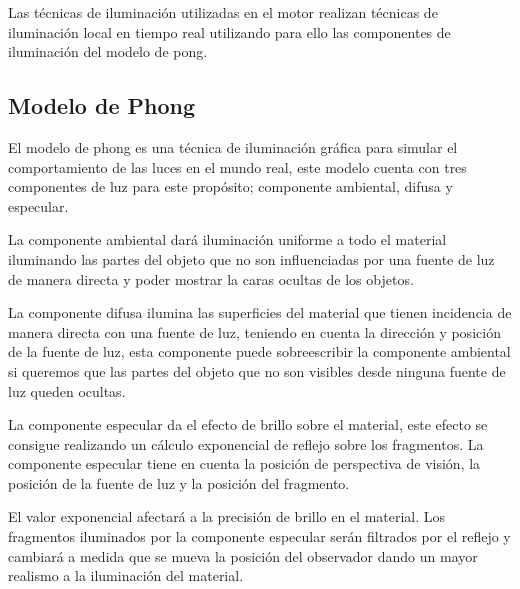 \documentclass[a4paper, 17pt]{book}
\begin{document}
Las técnicas de iluminación utilizadas en el motor realizan técnicas de iluminación local en tiempo real utilizando para ello las
componentes de iluminación del modelo de pong.

\subsection{Modelo de Phong} 
\label{sec:Modelo de Phong}

El modelo de phong es una técnica de iluminación gráfica para simular el comportamiento de las luces en el mundo real, este modelo
cuenta con tres componentes de luz para este propósito; componente ambiental, difusa y especular.

\vspace{1mm} %

La componente ambiental dará iluminación uniforme a todo el material iluminando las partes del objeto que no son influenciadas por
una fuente de luz de manera directa y poder mostrar la caras ocultas de los objetos.

\vspace{1mm} %

La componente difusa ilumina las superficies del material que tienen incidencia de manera directa con una fuente de luz, teniendo en
cuenta la dirección y posición de la fuente de luz, esta componente puede sobreescribir la componente ambiental si queremos que las
partes del objeto que no son visibles desde ninguna fuente de luz queden ocultas.

\vspace{1mm} %

La componente especular da el efecto de brillo sobre el material, este efecto se consigue realizando un cálculo exponencial de reflejo
sobre los fragmentos. La componente especular tiene en cuenta la posición de perspectiva de visión, la posición de la fuente de luz
y la posición del fragmento.

\vspace{1mm} %

El valor exponencial afectará a la precisión de brillo en el material. Los fragmentos iluminados por la componente especular serán
filtrados por el reflejo y cambiará a medida que se mueva la posición del observador dando un mayor realismo a la iluminación del
material.
\end{document}
